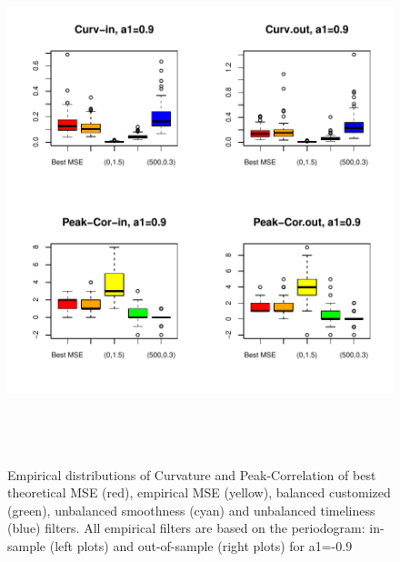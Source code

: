 \documentclass[a4paper]{book}
\begin{document}
\begin{appendix}
\begin{figure}[H]\begin{center}\includegraphics[height=6in, width=6in]{z_box_plot_emp_per_perf_inout_1}\caption{Empirical distributions
  of Curvature and Peak-Correlation of best theoretical MSE (red), empirical MSE (yellow), balanced customized (green),
  unbalanced smoothness (cyan) and unbalanced timeliness (blue) filters. All empirical filters are based on the periodogram:
  in-sample (left plots) and out-of-sample (right plots) for a1=-0.9\label{z_box_plot_emp_per_perf_inout_1}}\end{center}\end{figure}


\end{appendix}
\end{document}
